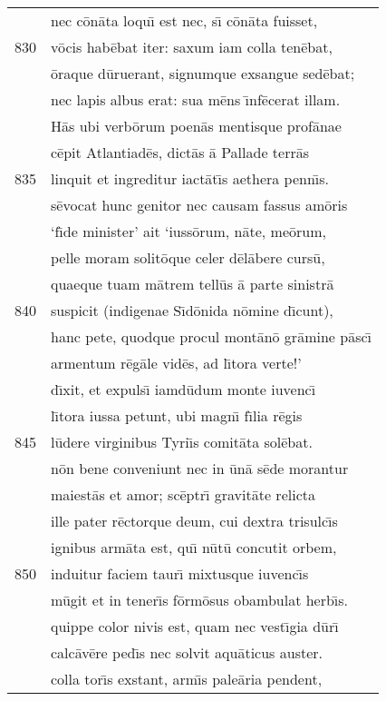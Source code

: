 \documentclass[paper=6in:9in,pagesize=pdftex,
               headinclude=on,footinclude=on,12pt]{scrbook}
\begin{document}
\begin{longtable}[p]{ r l }
 & nec c\=on\=ata loqu\={\i} est nec, s\={\i} c\=on\=ata fuisset,\\ 
830 & v\=ocis hab\=ebat iter: saxum iam colla ten\=ebat,\\ 
 & \=oraque d\=uruerant, signumque exsangue sed\=ebat;\\ 
 & nec lapis albus erat: sua m\=ens \={\i}nf\=ecerat illam.\\ 
 & \indent H\=as ubi verb\=orum poen\=as mentisque prof\=anae\\ 
 & c\=epit Atlantiad\=es, dict\=as \=a Pallade terr\=as\\ 
835 & linquit et ingreditur iact\=at\={\i}s aethera penn\={\i}s.\\ 
 & s\=evocat hunc genitor nec causam fassus am\=oris\\ 
 & `f\={\i}de minister' ait `iuss\=orum, n\=ate, me\=orum,\\ 
 & pelle moram solit\=oque celer d\=el\=abere curs\=u,\\ 
 & quaeque tuam m\=atrem tell\=us \=a parte sinistr\=a\\ 
840 & suspicit (indigenae S\={\i}d\=onida n\=omine d\={\i}cunt),\\ 
 & hanc pete, quodque procul mont\=an\=o gr\=amine p\=asc\={\i}\\ 
 & armentum r\=eg\=ale vid\=es, ad l\={\i}tora verte!'\\ 
 & d\={\i}xit, et expuls\={\i} iamd\=udum monte iuvenc\={\i}\\ 
 & l\={\i}tora iussa petunt, ubi magn\={\i} f\={\i}lia r\=egis\\ 
845 & l\=udere virginibus Tyri\={\i}s comit\=ata sol\=ebat.\\ 
 & n\=on bene conveniunt nec in \=un\=a s\=ede morantur\\ 
 & maiest\=as et amor; sc\=eptr\={\i} gravit\=ate relicta\\ 
 & ille pater r\=ectorque deum, cui dextra trisulc\={\i}s\\ 
 & ignibus arm\=ata est, qu\={\i} n\=ut\=u concutit orbem,\\ 
850 & induitur faciem taur\={\i} mixtusque iuvenc\={\i}s\\ 
 & m\=ugit et in tener\={\i}s f\=orm\=osus obambulat herb\={\i}s.\\ 
 & quippe color nivis est, quam nec vest\={\i}gia d\=ur\={\i}\\ 
 & calc\=av\=ere ped\={\i}s nec solvit aqu\=aticus auster.\\ 
 & colla tor\={\i}s exstant, arm\={\i}s pale\=aria pendent,\\ 

\end{longtable}
\end{document}
